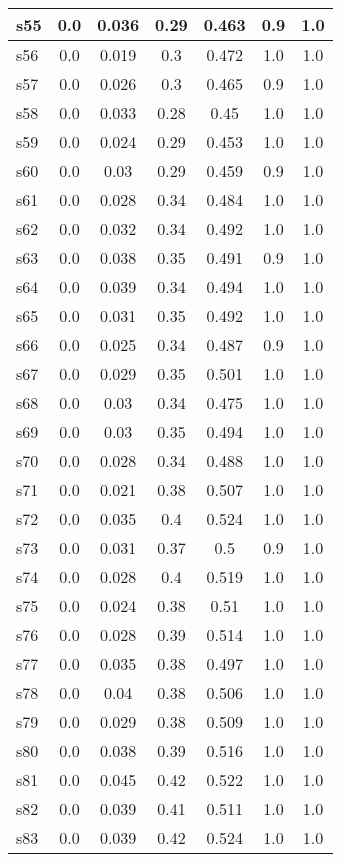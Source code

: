 \documentclass{article}
\begin{document}
\begin{tabular}{|l|c|c|c|c|c|c|}
\hline
s55 &0.0 & 0.036 & 0.29 & 0.463 & 0.9 & 1.0\\
\hline
s56 &0.0 & 0.019 & 0.3 & 0.472 & 1.0 & 1.0\\
\hline
s57 &0.0 & 0.026 & 0.3 & 0.465 & 0.9 & 1.0\\
\hline
s58 &0.0 & 0.033 & 0.28 & 0.45 & 1.0 & 1.0\\
\hline
s59 &0.0 & 0.024 & 0.29 & 0.453 & 1.0 & 1.0\\
\hline
s60 &0.0 & 0.03 & 0.29 & 0.459 & 0.9 & 1.0\\
\hline
s61 &0.0 & 0.028 & 0.34 & 0.484 & 1.0 & 1.0\\
\hline
s62 &0.0 & 0.032 & 0.34 & 0.492 & 1.0 & 1.0\\
\hline
s63 &0.0 & 0.038 & 0.35 & 0.491 & 0.9 & 1.0\\
\hline
s64 &0.0 & 0.039 & 0.34 & 0.494 & 1.0 & 1.0\\
\hline
s65 &0.0 & 0.031 & 0.35 & 0.492 & 1.0 & 1.0\\
\hline
s66 &0.0 & 0.025 & 0.34 & 0.487 & 0.9 & 1.0\\
\hline
s67 &0.0 & 0.029 & 0.35 & 0.501 & 1.0 & 1.0\\
\hline
s68 &0.0 & 0.03 & 0.34 & 0.475 & 1.0 & 1.0\\
\hline
s69 &0.0 & 0.03 & 0.35 & 0.494 & 1.0 & 1.0\\
\hline
s70 &0.0 & 0.028 & 0.34 & 0.488 & 1.0 & 1.0\\
\hline
s71 &0.0 & 0.021 & 0.38 & 0.507 & 1.0 & 1.0\\
\hline
s72 &0.0 & 0.035 & 0.4 & 0.524 & 1.0 & 1.0\\
\hline
s73 &0.0 & 0.031 & 0.37 & 0.5 & 0.9 & 1.0\\
\hline
s74 &0.0 & 0.028 & 0.4 & 0.519 & 1.0 & 1.0\\
\hline
s75 &0.0 & 0.024 & 0.38 & 0.51 & 1.0 & 1.0\\
\hline
s76 &0.0 & 0.028 & 0.39 & 0.514 & 1.0 & 1.0\\
\hline
s77 &0.0 & 0.035 & 0.38 & 0.497 & 1.0 & 1.0\\
\hline
s78 &0.0 & 0.04 & 0.38 & 0.506 & 1.0 & 1.0\\
\hline
s79 &0.0 & 0.029 & 0.38 & 0.509 & 1.0 & 1.0\\
\hline
s80 &0.0 & 0.038 & 0.39 & 0.516 & 1.0 & 1.0\\
\hline
s81 &0.0 & 0.045 & 0.42 & 0.522 & 1.0 & 1.0\\
\hline
s82 &0.0 & 0.039 & 0.41 & 0.511 & 1.0 & 1.0\\
\hline
s83 &0.0 & 0.039 & 0.42 & 0.524 & 1.0 & 1.0\\

\end{tabular}
\end{document}
